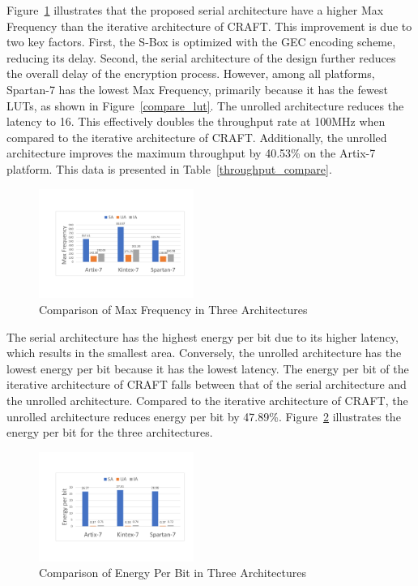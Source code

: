 \documentclass[final,5p,times,twocolumn]{elsarticle}
\begin{document}
Figure~\ref{compare-maxF} illustrates that the proposed serial architecture have a higher Max Frequency than the iterative architecture of CRAFT. This improvement is due to two key factors. First, the S-Box is optimized with the GEC encoding scheme, reducing its delay. Second, the serial architecture of the design further reduces the overall delay of the encryption process. However, among all platforms, Spartan-7 has the lowest Max Frequency, primarily because it has the fewest LUTs, as shown in Figure~\ref{compare_lut}. The unrolled architecture reduces the latency to 16. This effectively doubles the throughput rate at 100MHz when compared to the iterative architecture of CRAFT. Additionally, the unrolled architecture improves the maximum throughput by 40.53\% on the Artix-7 platform. This data is presented in Table~\ref{throughput_compare}.

\begin{figure}
    \centering
    \includegraphics[width=0.45\textwidth]{./compare-maxf.pdf}
    \caption{Comparison of Max Frequency in Three Architectures}\label{compare-maxF}
\end{figure}

The serial architecture has the highest energy per bit due to its higher latency, which results in the smallest area. Conversely, the unrolled architecture has the lowest energy per bit because it has the lowest latency. The energy per bit of the iterative architecture of CRAFT falls between that of the serial architecture and the unrolled architecture. Compared to the iterative architecture of CRAFT, the unrolled architecture reduces energy per bit by 47.89\%. Figure~\ref{compare-energy} illustrates the energy per bit for the three architectures.

\begin{figure}
    \centering
    \includegraphics[width=0.45\textwidth]{./compare-energy.pdf}
    \caption{Comparison of Energy Per Bit in Three Architectures}\label{compare-energy}
\end{figure}
\end{document}

